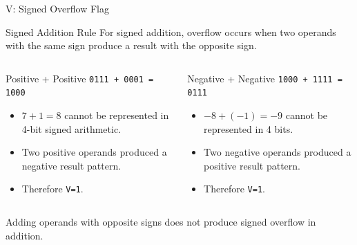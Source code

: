 \documentclass[aspectratio=169,11pt,t]{beamer}
\newcommand{\code}[1]{\texttt{#1}}
\begin{document}
\begin{frame}{V: Signed Overflow Flag}
\begin{block}{Signed Addition Rule}
For signed addition, overflow occurs when two operands with the same sign produce a result with the opposite sign.
\end{block}
\vspace{0.12cm}
\begin{columns}[T,onlytextwidth]
\begin{block}{Positive + Positive}
\large
\hspace{1.0cm}\code{0111 + 0001 = 1000}
\normalsize
\begin{itemize}
\item $7+1=8$ cannot be represented in 4-bit signed arithmetic.
\item Two positive operands produced a negative result pattern.
\item Therefore \code{V=1}.
\end{itemize}
\end{block}
\begin{block}{Negative + Negative}
\large
\hspace{1.0cm}\code{1000 + 1111 = 0111}
\normalsize
\begin{itemize}
\item $-8+(-1)=-9$ cannot be represented in 4 bits.
\item Two negative operands produced a positive result pattern.
\item Therefore \code{V=1}.
\end{itemize}
\end{block}
\end{columns}
\vspace{-0.03cm}
\small
Adding operands with opposite signs does not produce signed overflow in addition.
\normalsize
\end{frame}










\end{document}
